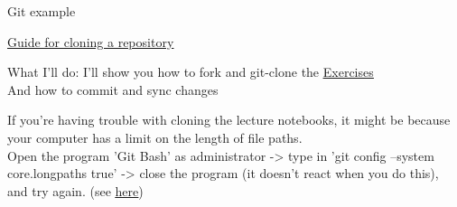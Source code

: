 \documentclass[10pt,danish,t,10pt]{beamer}
\begin{document}
\begin{frame}{Git example}

\href{https://numeconcopenhagen.netlify.app/guides/vscode-git/}{\underline{Guide for cloning a repository}} \par
\begin{alertblock}{What I'll do:}
    I'll show you how to fork and git-clone the \href{https://github.com/NumEconCopenhagen/exercises-2021}{\underline{Exercises}} \\
    And how to commit and sync changes
\end{alertblock}

If you're having trouble with cloning the lecture notebooks, it might be because your computer has a limit on the length of file paths. \\
Open the program 'Git Bash' as administrator ->  type in 'git config --system core.longpaths true' -> close the program (it doesn't react when you do this), and try again. (see \href{https://stackoverflow.com/questions/22575662/filename-too-long-in-git-for-windows}{\underline{here}})

\end{frame}
\end{document}
